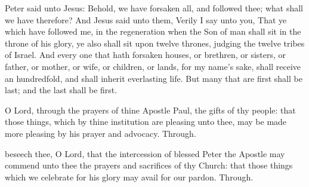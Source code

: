 
 Peter said unto Jesus: Behold, we have forsaken all, and followed thee; what shall we have therefore? And Jesus said unto them, Verily I say unto you, That ye which have followed me, in the regeneration when the Son of man shall sit in the throne of his glory, ye also shall sit upon twelve thrones, judging the twelve tribes of Israel. And every one that hath forsaken houses, or brethren, or sisters, or father, or mother, or wife, or children, or lands, for my name's sake, shall receive an hundredfold, and shall inherit everlasting life. But many that are first shall be last; and the last shall be first.


\vspace{-0.25\baselineskip}

\secret

\vspace{-0.1\baselineskip}

 O Lord, through the prayers of thine Apostle Paul, the gifts of thy people: that those things, which by thine institution are pleasing unto thee, may be made more pleasing by his prayer and advocacy. Through.

 beseech thee, O Lord, that the intercession of blessed Peter the Apostle may commend unto thee the prayers and sacrifices of thy Church: that those things which we celebrate for his glory may avail for our pardon. Through.


\vspace{-0.25\baselineskip}

\postcommunion

\vspace{-0.1\baselineskip}

